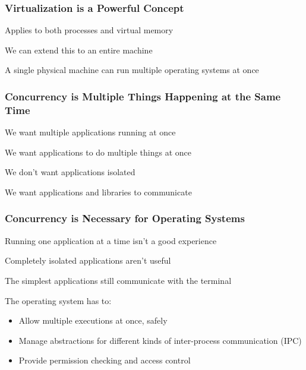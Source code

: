   \begin{frame}
    \frametitle{Virtualization is a Powerful Concept}

    Applies to both processes and virtual memory

    \vspace{4em}

    We can extend this to an entire machine

    \vspace{2em}

    A single physical machine can run multiple operating systems at once
  \end{frame}

  \begin{frame}
    \frametitle{Concurrency is Multiple Things Happening at the Same Time}

    We want multiple applications running at once

    \vspace{2em}

    We want applications to do multiple things at once

    \vspace{4em}

    We don't want applications isolated

    \vspace{2em}

    We want applications and libraries to communicate   
  \end{frame}

  \begin{frame}
    \frametitle{Concurrency is Necessary for Operating Systems}

    Running one application at a time isn't a good experience

    \vspace{2em}

    Completely isolated applications aren't useful

    \hspace{2em} The simplest applications still communicate with the terminal

    \vspace{4em}

    The operating system has to:
    \begin{itemize}
      \item Allow multiple executions at once, safely
      \item Manage abstractions for different kinds of inter-process communication (IPC)
      \item Provide permission checking and access control
    \end{itemize}
  \end{frame}

